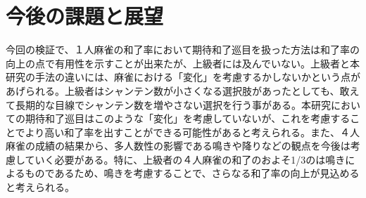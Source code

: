 \section{今後の課題と展望}
今回の検証で、１人麻雀の和了率において期待和了巡目を扱った方法は和了率の向上の点で有用性を示すことが出来たが、上級者には及んでいない。上級者と本研究の手法の違いには、麻雀における「変化」を考慮するかしないかという点があげられる。上級者はシャンテン数が小さくなる選択肢があったとしても、敢えて長期的な目線でシャンテン数を増やさない選択を行う事がある。本研究においての期待和了巡目はこのような「変化」を考慮していないが、これを考慮することでより高い和了率を出すことができる可能性があると考えられる。また、４人麻雀の成績の結果から、多人数性の影響である鳴きや降りなどの観点を今後は考慮していく必要がある。特に、上級者の４人麻雀の和了のおよそ1/3のは鳴きによるものであるため、鳴きを考慮することで、さらなる和了率の向上が見込めると考えられる。

\nocite{*}